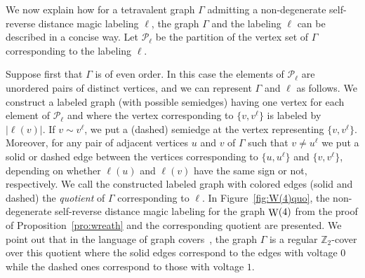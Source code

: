 \documentclass[11 pt,english]{article}
\newcommand{\ZZ}{\mathbb{Z}}
\newcommand{\G}{\Gamma}
\newcommand{\cP}{\mathcal{P}}
\newcommand{\Wr}{\mathop{\rm W}}
\theoremstyle{definition}
\begin{document}
We now explain how for a tetravalent graph $\G$ admitting a non-degenerate self-reverse distance magic labeling $\ell$, the graph $\G$ and the labeling $\ell$ can be described in a concise way. Let $\cP_\ell$ be the partition of the vertex set of $\G$ corresponding to the labeling $\ell$. 

Suppose first that $\G$ is of even order. In this case the elements of $\cP_\ell$ are unordered pairs of distinct vertices, and we can represent $\G$ and $\ell$ as follows. We construct a labeled graph (with possible semiedges) having one vertex for each element of $\cP_\ell$ and where the vertex corresponding to $\{v, v^\ell\}$ is labeled by $|\ell(v)|$. If $v \sim v^\ell$, we put a (dashed) semiedge at the vertex representing $\{v, v^\ell\}$. Moreover, for any pair of adjacent vertices $u$ and $v$ of $\G$ such that $v \neq u^\ell$ we put a solid or dashed edge between the vertices corresponding to $\{u,u^\ell\}$ and $\{v, v^\ell\}$, depending on whether $\ell(u)$ and $\ell(v)$ have the same sign or not, respectively. We call the constructed labeled graph with colored edges (solid and dashed) the {\em quotient} of $\G$ corresponding to $\ell$. In Figure~\ref{fig:W(4)quo}, the non-degenerate self-reverse distance magic labeling for the graph $\Wr(4)$ from the proof of Proposition~\ref{pro:wreath} and the corresponding quotient are presented. We point out that in the language of graph covers~\cite{GroTuc77, MalNedSko00}, the graph $\G$ is a regular $\ZZ_2$-cover over this quotient where the solid edges correspond to the edges with voltage $0$ while the dashed ones correspond to those with voltage $1$.
\end{document}
